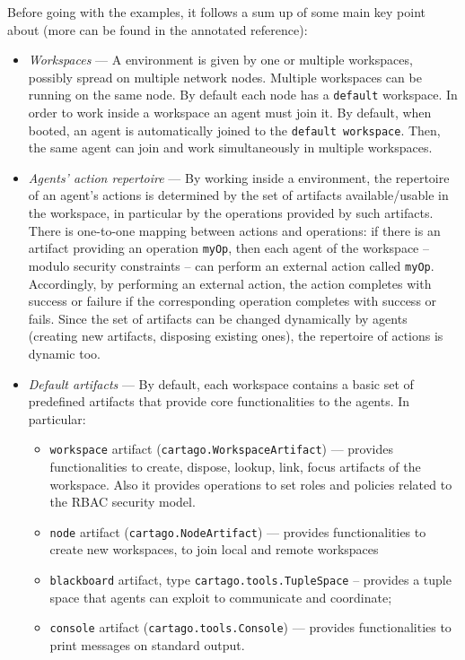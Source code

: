 \documentclass[11pt]{report}
\newcommand\code[1]{{\small{\mbox{\texttt{{#1}}}}}}
\newcommand{\cartago}{\mbox{\sf{CArtAgO}}}
\begin{document}
Before going with the examples, it follows a sum up of some main key point about {\cartago} (more can be found in the annotated reference):
%
\begin{itemize}
\item \emph{Workspaces} --- A {\cartago} environment is given by one or multiple workspaces, possibly spread on multiple network nodes. Multiple workspaces can be running on the same node. By default each node has a \code{default} workspace.
%
In order to work inside a workspace an agent must join it.  By default, when booted, an agent is automatically joined to the \code{default workspace}.
%
Then, the same agent can join and work simultaneously in multiple workspaces. 
%
\item \emph{Agents' action repertoire}  --- By working inside a {\cartago} environment, the repertoire of an agent's actions is determined by the set of artifacts available/usable in the workspace, in particular by the operations provided by such artifacts.
%
There is one-to-one mapping between actions and operations:
%
if there is an artifact providing an operation \code{myOp}, then each agent of the workspace -- modulo security constraints -- can perform an external action called \code{myOp}.
%
Accordingly, by performing an external action, the action completes with success or failure if the corresponding operation completes with success or fails.
%
Since the set of artifacts can be changed dynamically by agents (creating new artifacts, disposing existing ones), the repertoire of actions is dynamic too.

\item \emph{Default artifacts} --- By default, each workspace contains a basic set of predefined artifacts that provide core functionalities to the agents.
%
In particular:
\begin{itemize}
\item \code{workspace} artifact (\code{cartago.WorkspaceArtifact}) --- provides functionalities to create, dispose, lookup, link, focus artifacts of the workspace.
%
Also it provides operations to set roles and policies related to the RBAC security model.
%
\item \code{node} artifact (\code{cartago.NodeArtifact}) --- provides functionalities to create new workspaces, to join local and remote workspaces
%
\item \texttt{blackboard} artifact, type \code{cartago.tools.TupleSpace} -- provides a tuple space that agents can exploit to communicate and coordinate;
%
\item \code{console} artifact (\code{cartago.tools.Console}) --- provides functionalities to print messages on standard output.
%
\end{itemize}
%
\end{itemize}
\end{document}

